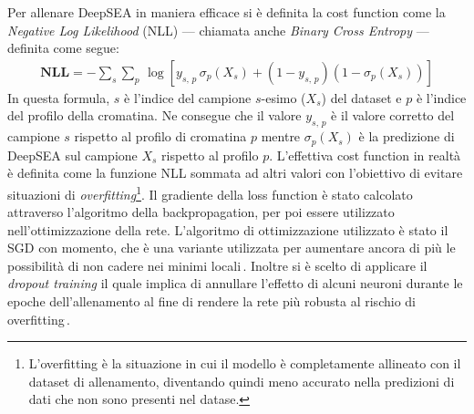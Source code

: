 Per allenare DeepSEA in maniera efficace si è definita la cost function come la \textit{Negative Log Likelihood} (\acs{NLL}) — chiamata anche \textit{Binary Cross Entropy} — definita come segue:
% 
\begin{gather*}
    \mathbf{NLL} = - \sum_s \sum_p\, \log\left[ y_{s,\,p}\,\sigma_p\left(X_s\right)  + \left( 1- y_{s,\,p} \right)\left(1 - \sigma_p\left(X_s\right) \right) \right]
\end{gather*}
% 
\noindent In questa formula, $s$ è l'indice del campione $s$-esimo ($X_s$) del dataset e $p$ è l'indice del profilo della cromatina. Ne consegue che il valore $y_{s,\,p}$ è il valore corretto del campione $s$ rispetto al profilo di cromatina $p$ mentre $\sigma_p\left(X_s\right)$ è la predizione di DeepSEA sul campione $X_s$ rispetto al profilo $p$. L'effettiva cost function in realtà è definita come la funzione \acs{NLL} sommata ad altri valori con l'obiettivo di evitare situazioni di \textit{overfitting}\footnote{L'overfitting è la situazione in cui il modello è completamente allineato con il dataset di allenamento, diventando quindi meno accurato nella predizioni di dati che non sono presenti nel datase.}. Il gradiente della loss function è stato calcolato attraverso l'algoritmo della backpropagation, per poi essere utilizzato nell'ottimizzazione della rete. L'algoritmo di ottimizzazione utilizzato è stato il \acs{SGD} con momento, che è una variante utilizzata per aumentare ancora di più le possibilità di non cadere nei minimi locali\,\cite{aggarwal2018neural}. Inoltre si è scelto di applicare il \textit{dropout training} il quale implica di annullare l'effetto di alcuni neuroni durante le epoche dell'allenamento al fine di rendere la rete più robusta al rischio di overfitting\,\cite{nielsen2015neural}.

